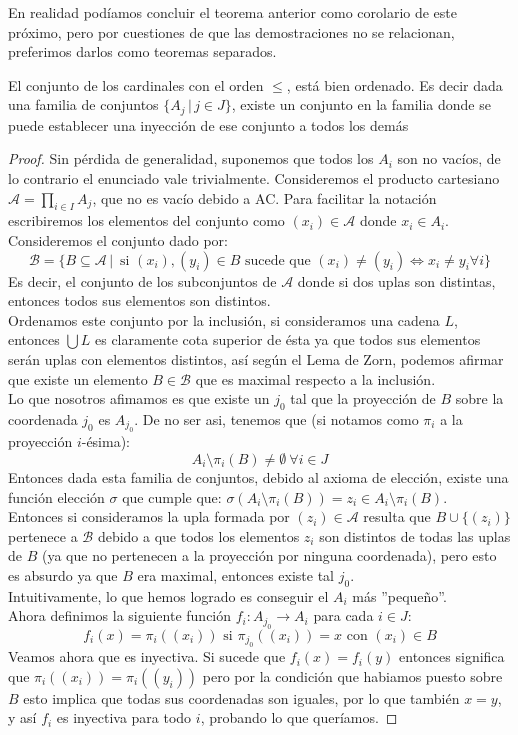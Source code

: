 \documentclass[12pt,a4paper]{book}
\begin{document}
En realidad podíamos concluir el teorema anterior como corolario de este próximo, pero por cuestiones de que las demostraciones no se relacionan, preferimos darlos como teoremas separados.
\begin{teo}
El conjunto de los cardinales con el orden $\leq$, está bien ordenado. Es decir dada una familia de conjuntos $\{A_j \,\vert\, j \in J\}$, existe un conjunto en la familia donde se puede establecer una inyección de ese conjunto a todos los demás
\begin{proof}
Sin pérdida de generalidad, suponemos que todos los $A_i$ son no vacíos, de lo contrario el enunciado vale trivialmente. Consideremos el producto cartesiano $\mathcal{A} = \prod_{i \in I} A_j $, que no es vacío debido a AC. Para facilitar la notación escribiremos los elementos del conjunto como $(x_i) \in \mathcal{A}$ donde $x_i \in A_i$.\\
Consideremos el conjunto dado por:
$$ \mathcal{B} = \{ B \subseteq \mathcal{A}\,\vert\, \mbox{ si }  (x_i),(y_i) \in B \mbox{ sucede que } (x_i) \neq (y_i) \Leftrightarrow x_i \neq y_i \forall i \}$$
Es decir, el conjunto de los subconjuntos de $\mathcal{A}$ donde si dos uplas son distintas, entonces todos sus elementos son distintos.\\
Ordenamos este conjunto por la inclusión, si consideramos una cadena $L$, entonces $\bigcup L$ es claramente cota superior de ésta ya que todos sus elementos serán uplas con elementos distintos, así según el Lema de Zorn, podemos afirmar que existe un elemento $B \in \mathcal{B}$ que es maximal respecto a la inclusión.\\
Lo que nosotros afimamos es que existe un $j_0$ tal que la proyección de $B$ sobre la coordenada $j_0$ es $A_{j_0}$. De no ser asi, tenemos que (si notamos como $ \pi_{i}$ a la proyección $i$-ésima):
$$ A_i \setminus \pi_i(B) \neq \emptyset \: \forall i \in J $$
Entonces dada esta familia de conjuntos, debido al axioma de elección, existe una función elección $\sigma$ que cumple que: $\sigma( A_i \setminus \pi_i(B)) = z_i \in A_i \setminus \pi_i(B).$\\
Entonces si consideramos la upla formada por $(z_i) \in \mathcal{A}$ resulta que $ B \cup \{(z_i)\}$ pertenece a $\mathcal{B}$ debido a que todos los elementos $z_i$ son distintos de todas las uplas de $B$ (ya que no pertenecen a la proyección por ninguna coordenada), pero esto es absurdo ya que $B$ era maximal, entonces existe tal $j_0$.\\
Intuitivamente, lo que hemos logrado es conseguir el $A_i$ más ''pequeño''.\\
Ahora definimos la siguiente función $f_i: A_{j_0} \rightarrow A_i$ para cada $ i \in J$:
$$ f_i(x) = \pi_i((x_i)) \mbox{ si } \pi_{j_0}((x_i))=x \mbox{ con } (x_i) \in B$$
Veamos ahora que es inyectiva. Si sucede que $f_i(x)=f_i(y)$ entonces significa que $\pi_i((x_i))=\pi_i((y_i))$ pero por la condición que habiamos puesto sobre $B$ esto implica que todas sus coordenadas son iguales, por lo que también $x = y$, y así $f_i$ es inyectiva para todo $i$, probando lo que queríamos.
\end{proof}
\end{teo}
\end{document}
